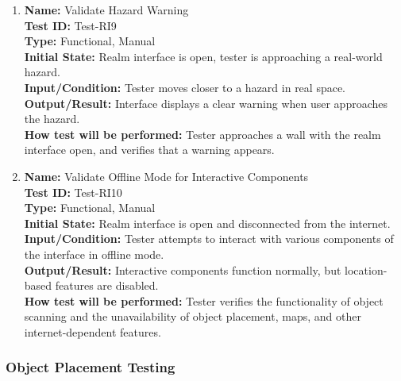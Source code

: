 \documentclass[12pt, titlepage]{article}
\begin{document}
\begin{enumerate}
  \item \textbf{Name:} Validate Hazard Warning \label{itm:Test-RI9} \\
        \textbf{Test ID:} Test-RI9 \\
        \textbf{Type:} Functional, Manual \\
        \textbf{Initial State:} Realm interface is open, tester is approaching a real-world hazard. \\
        \textbf{Input/Condition:} Tester moves closer to a hazard in real space. \\
        \textbf{Output/Result:} Interface displays a clear warning when user approaches the hazard. \\
        \textbf{How test will be performed:} Tester approaches a wall with the realm interface open, and verifies that a warning appears.


  \item \textbf{Name:} Validate Offline Mode for Interactive Components \label{itm:Test-RI10} \\
        \textbf{Test ID:} Test-RI10 \\
        \textbf{Type:} Functional, Manual \\
        \textbf{Initial State:} Realm interface is open and disconnected from the internet. \\
        \textbf{Input/Condition:} Tester attempts to interact with various components of the interface in offline mode. \\
        \textbf{Output/Result:} Interactive components function normally, but location-based features are disabled. \\
        \textbf{How test will be performed:} Tester verifies the functionality of object scanning and the unavailability of object placement, maps, and other internet-dependent features.

\end{enumerate}

\subsubsection{Object Placement Testing}
\end{document}
